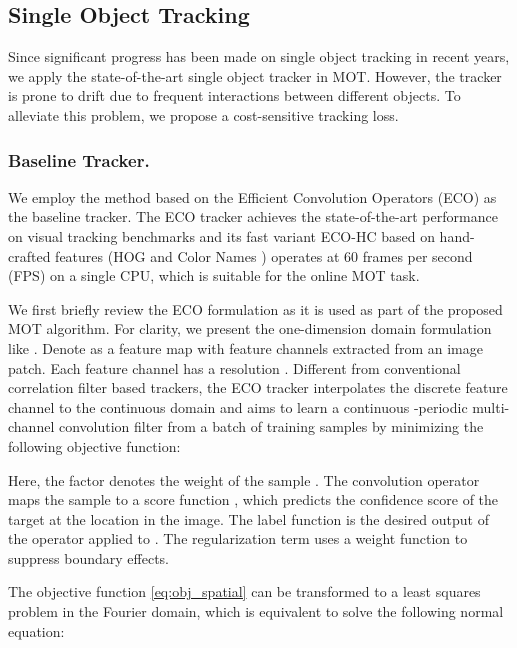 \documentclass[runningheads]{llncs}
\begin{document}
  \vspace{-2mm}
  \subsection{Single Object Tracking}
  Since significant progress has been made on single object tracking in recent years, we apply the state-of-the-art single object tracker in MOT. 
However, the tracker is prone to drift due to frequent interactions between different objects. 
To alleviate this problem,  we propose a cost-sensitive tracking loss. 
  
  \vspace{-2mm}
  \subsubsection{Baseline Tracker.}
  We employ the method based on the Efficient Convolution Operators (ECO) \cite{ECO} as the baseline tracker. 
The ECO tracker achieves the state-of-the-art performance on visual tracking benchmarks \cite{VOT,OTB,UAV,TC} and its fast variant ECO-HC based on hand-crafted features (HOG \cite{HOG} and Color Names \cite{CN}) operates at 60 frames per second (FPS) on a single CPU, which is suitable for the online MOT task.
  
  We first briefly review the ECO formulation as it is used as part of the proposed MOT algorithm.
For clarity, we present the one-dimension domain formulation like \cite{ECO,CCOT}. Denote  as a feature map with  feature channels extracted from an image patch. Each feature channel  has a resolution .
Different from conventional correlation filter based trackers, the ECO tracker interpolates the discrete feature channel  to the continuous domain  and aims to learn a continuous -periodic multi-channel convolution filter  from a batch of  training samples  by minimizing the following objective function:
  
  Here, the factor  denotes the weight of the sample . The convolution operator  maps the sample  to a score function , which predicts the confidence score of the target at the location  in the image. The label function  is the desired output of the operator  applied to . The regularization term uses a weight function  to suppress boundary effects.
  
  The objective function \eqref{eq:obj_spatial} can be transformed to a least squares problem in the Fourier domain, which is equivalent to solve the following normal equation:
  
\end{document}
